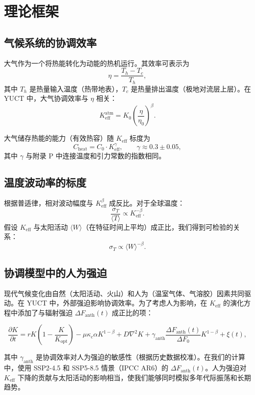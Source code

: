 \documentclass[12pt,a4paper]{article}
\newcommand{\Keff}{K_{\mathrm{eff}}}
\newcommand{\be}{\beta}
\newcommand{\ga}{\gamma}
\begin{document}
	\section{理论框架}
	
	\subsection{气候系统的协调效率}
	
	大气作为一个将热能转化为动能的热机运行。其效率可表示为
	\[
	\eta = \frac{T_h - T_c}{T_h},
	\]
	其中 \(T_h\) 是热量输入温度（热带地表），\(T_c\) 是热量排出温度（极地对流层上层）。在 YUCT 中，大气协调效率与 \(\eta\) 相关：
	\[
	\Keff^{\text{atm}} = K_0 \left( \frac{\eta}{\eta_0} \right)^{\be}.
	\]
	
	大气储存热能的能力（有效热容）随 \(\Keff\) 标度为
	\[
	C_{\text{heat}} = C_0 \cdot \Keff^{\ga}, \qquad \ga \approx 0.3 \pm 0.05,
	\]
	其中 \(\ga\) 与附录 P 中连接温度和引力常数的指数相同。
	
	\subsection{温度波动率的标度}
	
	根据普适律，相对波动幅度与 \(\Keff^{\be}\) 成反比。对于全球温度：
	\[
	\frac{\sigma_T}{\langle T \rangle} \propto \Keff^{-\be}.
	\]
	假设 \(\Keff\) 与太阳活动 \(\langle W \rangle\)（在特征时间上平均）成正比，我们得到可检验的关系：
	\[
	\sigma_T \propto \langle W \rangle^{-\be}.
	\]
	
	\subsection{协调模型中的人为强迫}
	
	现代气候变化由自然（太阳活动、火山）和人为（温室气体、气溶胶）因素共同驱动。在 YUCT 中，外部强迫影响协调效率。为了考虑人为影响，在 \(K_{\mathrm{eff}}\) 的演化方程中添加了与辐射强迫 \(\Delta F_{\mathrm{anth}}(t)\) 成正比的项：
	
	\[
	\frac{\partial K}{\partial t} = r K \left(1 - \frac{K}{K_{\mathrm{opt}}}\right) - \mu \kappa_c \alpha K^{1-\beta} 
	+ D\nabla^2 K + \gamma_{\mathrm{anth}} \frac{\Delta F_{\mathrm{anth}}(t)}{\Delta F_0} K^{1-\beta} + \xi(t),
	\]
	
	其中 \(\gamma_{\mathrm{anth}}\) 是协调效率对人为强迫的敏感性（根据历史数据校准）。在我们的计算中，使用 SSP2-4.5 和 SSP5-8.5 情景（IPCC AR6）的 \(\Delta F_{\mathrm{anth}}(t)\)。人为强迫对 \(K_{\mathrm{eff}}\) 下降的贡献与太阳活动的影响相当，使我们能够同时模拟多年代际振荡和长期趋势。
	
\end{document}
